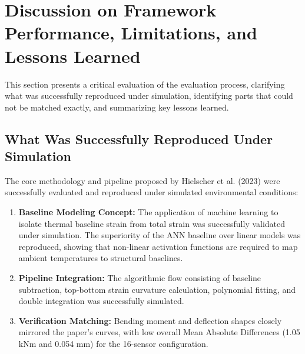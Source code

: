 \documentclass[11pt,journal,onecolumn]{IEEEtran}
\begin{document}
\section{Discussion on Framework Performance, Limitations, and Lessons Learned}
This section presents a critical evaluation of the evaluation process, clarifying what was successfully reproduced under simulation, identifying parts that could not be matched exactly, and summarizing key lessons learned.

\subsection{What Was Successfully Reproduced Under Simulation}
The core methodology and pipeline proposed by Hielscher et al. (2023) were successfully evaluated and reproduced under simulated environmental conditions:
\begin{enumerate}
    \item \textbf{Baseline Modeling Concept:} The application of machine learning to isolate thermal baseline strain from total strain was successfully validated under simulation. The superiority of the ANN baseline over linear models was reproduced, showing that non-linear activation functions are required to map ambient temperatures to structural baselines.
    \item \textbf{Pipeline Integration:} The algorithmic flow consisting of baseline subtraction, top-bottom strain curvature calculation, polynomial fitting, and double integration was successfully simulated.
    \item \textbf{Verification Matching:} Bending moment and deflection shapes closely mirrored the paper's curves, with low overall Mean Absolute Differences (1.05 kNm and 0.054 mm) for the 16-sensor configuration.
\end{enumerate}
\end{document}
